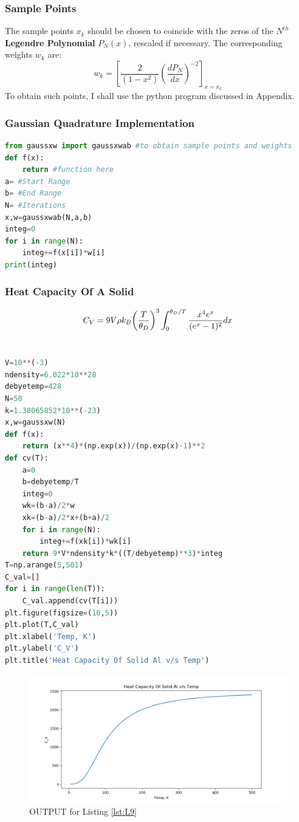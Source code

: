 \subsubsection{Sample Points}
The sample points $x_{k}$ should be chosen to coincide with the zeros of the $N^{th}$ \textbf{Legendre Polynomial} $P_{N}(x)$, rescaled if necessary. The corresponding weights $w_{k}$ are:$$w_{k}=\left[\dfrac{2}{(1-x^{2})}\left(\dfrac{dP_{N}}{dx}\right)^{-2}\right]_{x=x_{k}}$$
To obtain such points, I shall use the python program discussed in Appendix.
\subsubsection{Gaussian Quadrature Implementation}
\begin{lstlisting}[language=Python, caption=Gaussian Quadrature, frame=single, label={lst:L8} ]
from gaussxw import gaussxwab #to obtain sample points and weights
def f(x):
	return #function here
a= #Start Range
b= #End Range
N= #Iterations
x,w=gaussxwab(N,a,b)
integ=0
for i in range(N):
	integ+=f(x[i])*w[i]
print(integ)
\end{lstlisting}
\subsubsection{Heat Capacity Of A Solid}
\medskip
\begin{displaymath}
C_V = 9V\rho k_B \biggl( {T\over\theta_D} \biggr)^3 \int_0^{\theta_D/T}
{ \dfrac{x^{4}e^x}{(e^x-1)^2} dx}
\end{displaymath}
\\
\begin{lstlisting}[language=Python, caption=Heat Capacity, frame=single, label={lst:L9} ]
V=10**(-3)
ndensity=6.022*10**28
debyetemp=428
N=50
k=1.38065852*10**(-23)
x,w=gaussxw(N)
def f(x):
	return (x**4)*(np.exp(x))/(np.exp(x)-1)**2
def cv(T):
	a=0
	b=debyetemp/T
	integ=0
	wk=(b-a)/2*w
	xk=(b-a)/2*x+(b+a)/2
	for i in range(N):
		integ+=f(xk[i])*wk[i]
	return 9*V*ndensity*k*((T/debyetemp)**3)*integ
T=np.arange(5,501)
C_val=[]
for i in range(len(T)):
	C_val.append(cv(T[i]))
plt.figure(figsize=(10,5))
plt.plot(T,C_val)
plt.xlabel('Temp, K')
plt.ylabel('C_V')
plt.title('Heat Capacity Of Solid Al v/s Temp')
\end{lstlisting}
\newpage
\begin{figure}[H]
	\centering
	\includegraphics[width=1\linewidth]{heatcapacity}
	\caption{OUTPUT for Listing \ref{lst:L9}}
	\label{fig:heatcapacity}
\end{figure}
